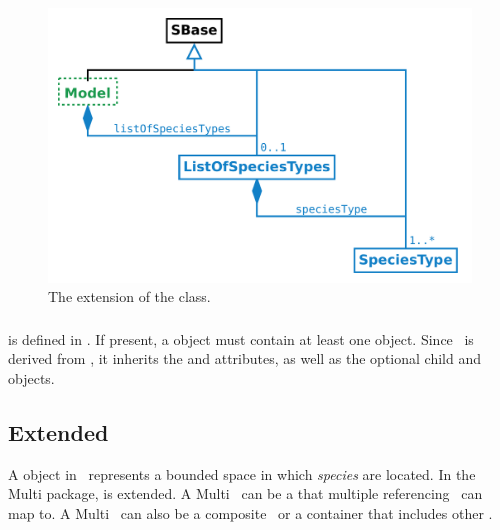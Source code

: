 \begin{figure}[htb]
  \begin{center}
    \includegraphics[scale=0.37]{./figs/multi_001_model.pdf}
    \caption{The extension of the \Model class.}
  \label{fig:Model}
  \end{center}
\end{figure}

\subsubsection{}
\label{def:ListOfSpeciesTypes}

 is defined in . If present, a \ListOfSpeciesTypes object must contain at least one \SpeciesType object.  Since \ListOfSpeciesTypes\ is derived from , it inherits the  and  attributes, as well as the optional \mBlockChangedBegin{\revTwentyTwentyMarch}child\mBlockChangedEnd{\revTwentyTwentyMarch}  and  objects. 


\subsection{Extended }
\label{def:Compartment}

A \Compartment object in \SbmlLevelThreeCore\ represents a bounded space in which \textit{species} are located. In the Multi package, \Compartment is extended. A Multi \compartment\ can be a  that multiple referencing \compartments\ can map to. A Multi \compartment\ can also be a composite \compartment\ or a container that includes other \compartments.

